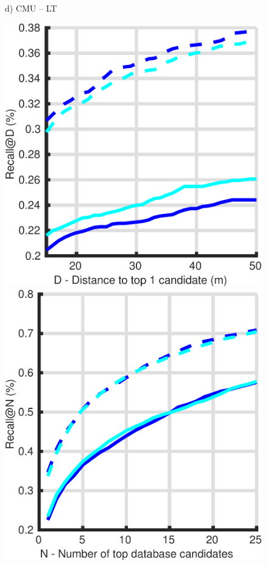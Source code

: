 \begin{figure}
\begin{minipage}{0.27\linewidth}
		d) CMU -- LT
	\end{minipage}
	\begin{minipage}{0.27\linewidth}
		\center \scriptsize
		\includegraphics[width=\linewidth]{plot/night_ft/Results_cmu_snow/distance}	
		
		\includegraphics[width=\linewidth]{plot/night_ft/Results_cmu_snow/recall}
		

\end{minipage}
\end{figure}
